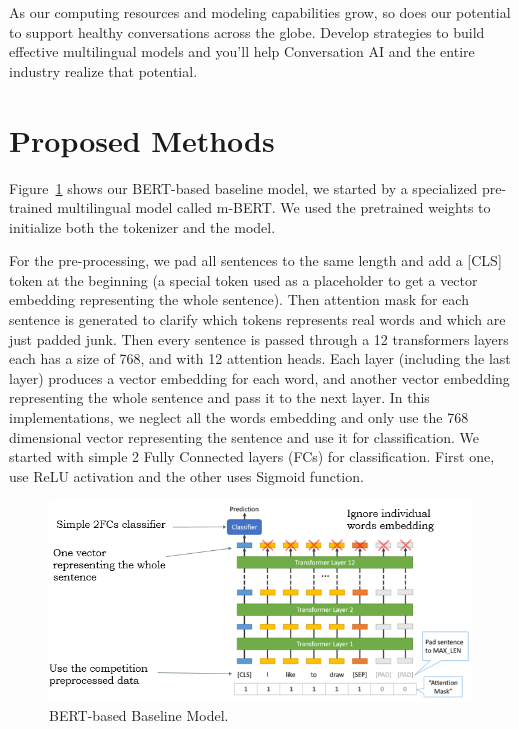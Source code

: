 \documentclass[10pt,twocolumn,letterpaper]{article}
\begin{document}
As our computing resources and modeling capabilities grow, so does our potential to support healthy conversations across the globe. Develop strategies to build effective multilingual models and you'll help Conversation AI and the entire industry realize that potential.

\section{Proposed Methods}
Figure~\ref{BERTbasedModel} shows our BERT-based\cite{devlin2018bert} baseline model, we started by a specialized pre-trained multilingual model called m-BERT. We used the pretrained weights to initialize both the tokenizer and the model.

For the pre-processing, we pad all sentences to the same length and add a [CLS] token at the beginning (a special token used as a placeholder to get a vector embedding representing the whole sentence). Then attention mask for each sentence is generated to clarify which tokens represents real words and which are just padded junk. Then every sentence is passed through a 12 transformers layers each has a size of 768, and with 12 attention heads. Each layer (including the last layer) produces a vector embedding for each word, and another vector embedding representing the whole sentence and pass it to the next layer. In this implementations, we neglect all the words embedding and only use the 768 dimensional vector representing the sentence and use it for classification. We started with simple 2 Fully Connected layers (FCs) for classification. First one, use ReLU activation and the other uses Sigmoid function. 

\begin{figure}[htbp]
\centerline{\includegraphics[width=0.999\columnwidth]{Figures/BERTbasedModel.png}}
\caption{BERT-based Baseline Model.}
\label{BERTbasedModel}
\end{figure}
\end{document}
